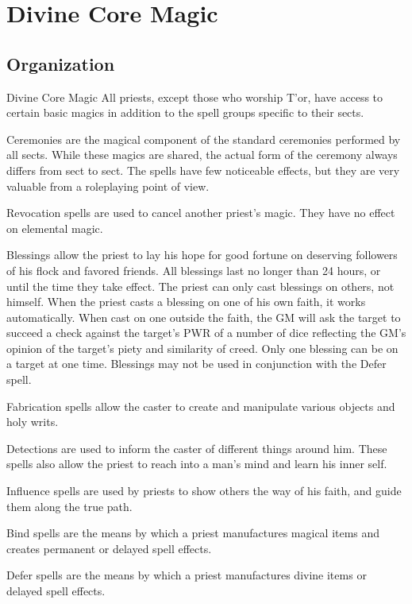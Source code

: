 \chapter{Divine Core Magic}
\label{ch:divine-core-magic}
\section{Organization}
Divine Core Magic
All priests, except those who worship T’or, have access to certain basic magics in addition to the spell groups specific to their sects.

Ceremonies are the magical component of the standard ceremonies performed by all sects. While these magics are shared, the actual form of the ceremony always differs from sect to sect. The spells have few noticeable effects, but they are very valuable from a roleplaying point of view.

Revocation spells are used to cancel another priest’s magic. They have no effect on elemental magic.

Blessings allow the priest to lay his hope for good fortune on deserving followers of his flock and favored friends. All blessings last no longer than 24 hours, or until the time they take effect. The priest can only cast blessings on others, not himself. When the priest casts a blessing on one of his own faith, it works automatically. When cast on one outside the faith, the GM will ask the target to succeed a check against the target’s PWR of a number of dice reflecting the GM’s opinion of the target’s piety and similarity of creed. Only one blessing can be on a target at one time. Blessings may not be used in conjunction with the Defer spell.

Fabrication spells allow the caster to create and manipulate various objects and holy writs.

Detections are used to inform the caster of different things around him. These spells also allow the priest to reach into a man’s mind and learn his inner self.

Influence spells are used by priests to show others the way of his faith, and guide them along the true path.

Bind spells are the means by which a priest manufactures magical items and creates permanent or delayed spell effects.

Defer spells are the means by which a priest manufactures divine items or delayed spell effects.

